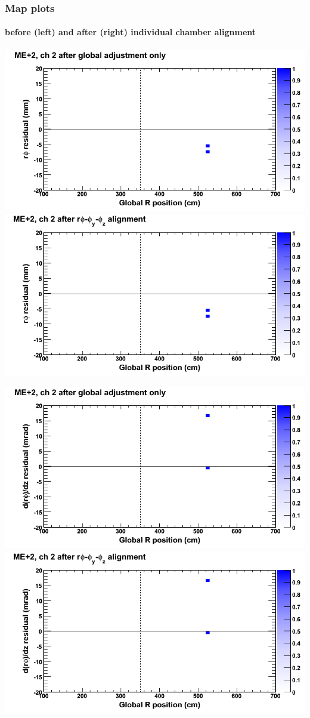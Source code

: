 \documentclass[compress]{beamer}
\begin{document}
\begin{frame}
\frametitle{Map plots}
\framesubtitle{before (left) and after (right) individual chamber alignment}
\includegraphics[width=0.5\linewidth]{ringmapplots_3dof/before_CSCvsr_mep2ch02_x.png} \includegraphics[width=0.5\linewidth]{ringmapplots_3dof/after_CSCvsr_mep2ch02_x.png}

\includegraphics[width=0.5\linewidth]{ringmapplots_3dof/before_CSCvsr_mep2ch02_dxdz.png} \includegraphics[width=0.5\linewidth]{ringmapplots_3dof/after_CSCvsr_mep2ch02_dxdz.png}
\end{frame}
\end{document}
